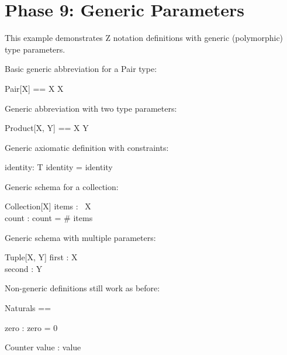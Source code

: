 \documentclass[a4paper,10pt,fleqn]{article}
\begin{document}
\section*{Phase 9: Generic Parameters}

\noindent This example demonstrates Z notation definitions with generic (polymorphic) type parameters.

\bigskip

\noindent Basic generic abbreviation for a Pair type:

\bigskip

\begin{zed}
Pair[X] == X \cross X
\end{zed}

\noindent Generic abbreviation with two type parameters:

\bigskip

\begin{zed}
Product[X, Y] == X \cross Y
\end{zed}

\noindent Generic axiomatic definition with constraints:

\bigskip

\begin{gendef}[T]
  identity: T
\where
  identity = identity
\end{gendef}

\noindent Generic schema for a collection:

\bigskip

\begin{schema}{Collection}[X]
items : \seq~X \\
count : \nat
\where
count = \# items
\end{schema}

\noindent Generic schema with multiple parameters:

\bigskip

\begin{schema}{Tuple}[X, Y]
first : X \\
second : Y
\end{schema}

\noindent Non-generic definitions still work as before:

\bigskip

\begin{zed}
Naturals == \nat
\end{zed}

\begin{axdef}
zero : \nat
\where
zero = 0
\end{axdef}

\begin{schema}{Counter}
value : \nat
\where
value 
\end{schema}
\end{document}

